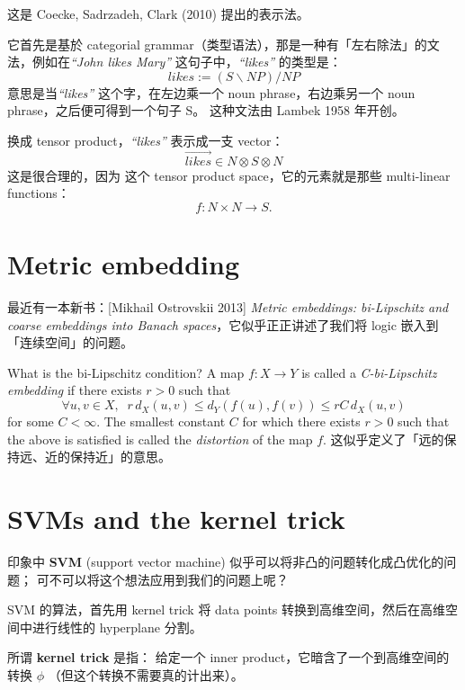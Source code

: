 \documentclass[12pt]{article}
\newcommand{\english}[1]{\rmfamily \textit{``#1''}\rmfamily}
\begin{document}
这是 Coecke, Sadrzadeh, Clark (2010)\cite{Coecke2010} 提出的表示法。

它首先是基於 categorial grammar（类型语法），那是一种有「左右除法」的文法，例如在\english{John likes Mary} 这句子中，\english{likes} 的类型是：
$$ likes := (S\backslash NP)/NP $$
意思是当\english{likes} 这个字，在左边乘一个 noun phrase，右边乘另一个 noun phrase，之后便可得到一个句子 S。 这种文法由 Lambek 1958 年开创。

换成 tensor product，\english{likes} 表示成一支 vector：
$$ \overrightarrow{likes} \in N \otimes S \otimes N $$
这是很合理的，因为 这个 tensor product space，它的元素就是那些 multi-linear functions：
$$ f : N \times N \rightarrow S. $$

\section{Metric embedding}

最近有一本新书：[Mikhail Ostrovskii 2013] \textit{Metric embeddings: bi-Lipschitz and coarse embeddings into Banach spaces}\cite{Ostrovskii2013}，它似乎正正讲述了我们将 logic 嵌入到「连续空间」的问题。

What is the bi-Lipschitz condition?  A map $f: X \rightarrow Y$ is called a \textit{C-bi-Lipschitz embedding} if there exists $r > 0$ such that
$$ \forall u,v \in X, \;\; r\, d_X(u,v) \leq d_Y(f(u), f(v)) \leq r C\, d_X(u,v) $$
for some $C < \infty$.  The smallest constant $C$ for which there exists $r > 0$ such that the above is satisfied is called the \textit{distortion} of the map $f$.  这似乎定义了「远的保持远、近的保持近」的意思。

\section{SVMs and the kernel trick}

印象中 \textbf{SVM} (support vector machine) 似乎可以将非凸的问题转化成凸优化的问题； 可不可以将这个想法应用到我们的问题上呢？

SVM 的算法，首先用 kernel trick 将 data points 转换到高维空间，然后在高维空间中进行线性的 hyperplane 分割。

所谓 \textbf{kernel trick} 是指： 给定一个 inner product，它暗含了一个到高维空间的转换 $\phi$ （但这个转换不需要真的计出来）。

\end{document}

